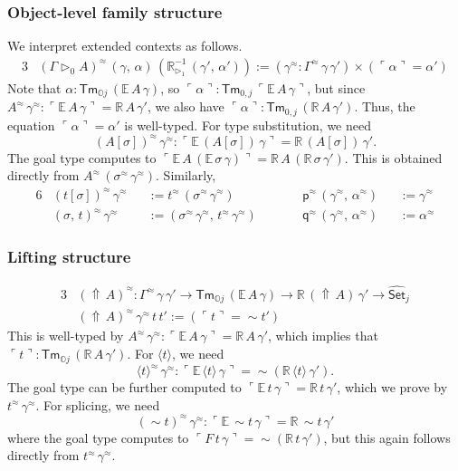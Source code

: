 \documentclass[acmsmall]{acmart}
\newcommand{\msf}[1]{\mathsf{#1}}
\newcommand{\mbb}[1]{\mathbb{#1}}
\newcommand{\wh}[1]{\widehat{#1}}
\newcommand{\ext}{\triangleright}
\newcommand{\Lift}{{\Uparrow}}
\newcommand{\spl}{{\sim}}
\newcommand{\qut}[1]{\langle #1\rangle}
\newcommand{\mbbo}{\mbb{O}}
\newcommand{\Tm}{\msf{Tm}}
\newcommand{\p}{\mathsf{p}}
\newcommand{\q}{\mathsf{q}}
\newcommand{\Set}{\mathsf{Set}}
\newcommand{\emb}[1]{\ulcorner#1\urcorner}
\newcommand{\ev}{\mbb{E}}
\newcommand{\re}{\mbb{R}}
\theoremstyle{remark}
\newcommand{\whset}{\wh{\Set}}
\newcommand{\rexti}{\re_{\ext_1}^{-1}}
\newcommand{\rel}{^{\approx}}
\begin{document}
\subsubsection{Object-level family structure} We interpret extended contexts as follows.
\begin{alignat*}{3}
  & (\Gamma \ext_0 A)\rel\,(\gamma,\,\alpha)\,(\rexti\,(\gamma',\,\alpha')) := (\gamma\rel : \Gamma\rel\,\gamma\,\gamma') \times (\emb{\alpha} = \alpha')
\end{alignat*}
Note that $\alpha : \Tm_{\mbbo j}\,(\ev\,A\,\gamma)$, so $\emb{\alpha} :
\Tm_{0,j}\,\emb{\ev\,A\,\gamma}$, but since $A\rel\,\gamma\rel :
\emb{\ev\,A\,\gamma} = \re\,A\,\gamma'$, we also have $\emb{\alpha} :
\Tm_{0,j}\,(\re\,A\,\gamma')$. Thus, the equation $\emb{\alpha} = \alpha'$ is
well-typed. For type substitution, we need
\[
  (A[\sigma])\rel\,\gamma\rel : \emb{\ev\,(A[\sigma])\,\gamma} = \re\,(A[\sigma])\,\gamma'.
\]
The goal type computes to $\emb{\ev\,A\,(\ev\,\sigma\,\gamma)} =
\re\,A\,(\re\,\sigma\,\gamma')$. This is obtained directly from
$A\rel\,(\sigma\rel\,\gamma\rel)$.  Similarly,
\begin{alignat*}{6}
  & (t[\sigma])\rel\,\gamma\rel &&:= t\rel\,(\sigma\rel\,\gamma\rel) && \p\rel\,(\gamma\rel,\,\alpha\rel) &&:= \gamma\rel \\
  & (\sigma,\,t)\rel\,\gamma\rel &&:= (\sigma\rel\,\gamma\rel,\,t\rel\,\gamma\rel)\hspace{2em}&& \q\rel\,(\gamma\rel,\,\alpha\rel) &&:= \alpha\rel
\end{alignat*}

\subsubsection{Lifting structure}
\begin{alignat*}{3}
  &(\Lift\,A)\rel : \Gamma\rel\,\gamma\,\gamma' \to \Tm_{\mbbo j}\,(\ev\,A\,\gamma) \to \re\,(\Lift\,A)\,\gamma' \to \whset_j\\
  &(\Lift\,A)\rel\,\gamma\rel\,t\,t' := (\emb{t} = \spl t')
\end{alignat*}
This is well-typed by $A\rel\,\gamma\rel : \emb{\ev\,A\,\gamma} = \re\,A\,\gamma'$, which implies
that $\emb{t} : \Tm_{\mbbo j}\,(\re\,A\,\gamma')$. For $\qut{t}$, we need
\[  \qut{t}\rel\,\gamma\rel : \emb{\ev\,\qut{t}\,\gamma} = \spl(\re\,\qut{t}\,\gamma'). \]
The goal type can be further computed to $\emb{\ev\,t\,\gamma} = \re\,t\,\gamma'$, which we prove
by $t\rel\,\gamma\rel$. For splicing, we need
\[
  (\spl t)\rel\,\gamma\rel : \emb{\ev\,\spl t\,\gamma} = \re\,\spl t\,\gamma'
\]
where the goal type computes to $\emb{F\,t\,\gamma} = \spl(\re\,t\,\gamma')$,
but this again follows directly from $t\rel\,\gamma\rel$.
\end{document}
